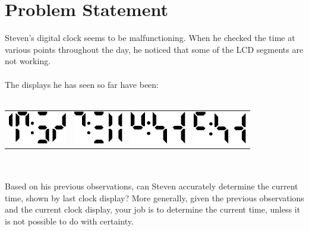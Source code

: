 \documentclass[a4paper,11pt,oneside]{article}
\begin{document}
\pagestyle{fancy}



\section{Problem Statement}

Steven's digital clock seems to be malfunctioning. When he checked the time at various
points throughout the day, he noticed that some of the LCD segments are not working.
\\\\
The displays he has seen so far have been:
\\\\
\begin{tabularx}{\textwidth}{X X X X}
\includegraphics[height=40pt]{./assets/testclock_1.eps}&
\includegraphics[height=40pt]{./assets/testclock_2.eps}&
\includegraphics[height=40pt]{./assets/testclock_3.eps}&
\includegraphics[height=40pt]{./assets/clock_4.eps}
\end{tabularx}
\\\\
Based on his previous observations, can Steven accurately determine the current time,
shown by last clock display? More generally, given the previous observations and the
current clock display, your job is to determine the current time, unless it is not
possible to do with certainty.
\end{document}
